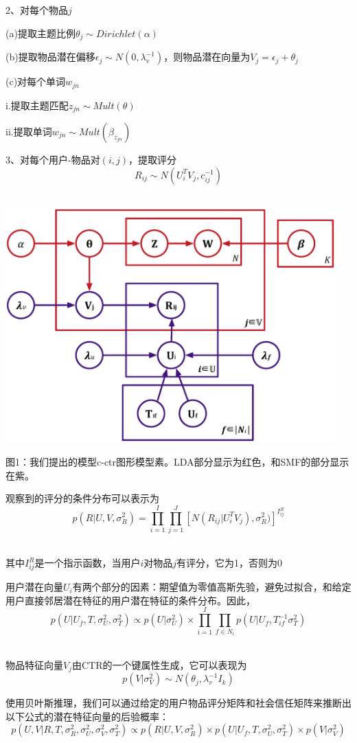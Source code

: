 \documentclass[10pt,a4paper]{article}
\theoremstyle{mythm}%
\numberwithin{equation}{section}
\begin{document}
2、对每个物品$j$

(a)提取主题比例$\theta_j \sim Dirichlet(\alpha)$

(b)提取物品潜在偏移$\epsilon_j \sim N(0,\lambda_v^{-1})$，则物品潜在向量为$V_j = \epsilon_j + \theta_j$

(c)对每个单词$w_{jn}$

i.提取主题匹配$z_{jn} \sim Mult(\theta)$

ii.提取单词$w_{jn}\sim Mult(\beta_{z_{jn}})$

3、对每个用户-物品对$(i,j)$，提取评分
\[R_{ij}\sim N(U_i^T V_j,c_{ij}^{-1})\]\

\includegraphics[width=5in]{figure1.eps} 

图1：我们提出的模型c-ctr图形模型素。LDA部分显示为红色，和SMF的部分显示在紫。

观察到的评分的条件分布可以表示为
\[p(R|U,V,\sigma_R^2) = {\prod}_{i=1}^I {\prod}_{j=1}^J{[N(R_{ij}|U_i^T V_j),\sigma_R^2)]}^{I_{ij}^R}\]\

其中$I_{ij}^R$是一个指示函数，当用户$i$对物品$j$有评分，它为1，否则为0

用户潜在向量$U_i$有两个部分的因素：期望值为零值高斯先验，避免过拟合，和给定用户直接邻居潜在特征的用户潜在特征的条件分布。因此，
\[p(U|U_f,T,\sigma_U^2,\sigma_T^2) \propto p(U|\sigma_U^2) \times {\prod}_{i=1}^I {\prod}_{f\in N_i} p(U|U_f,T_{if}^{-1}\sigma_T^2)\]\


物品特征向量$V_j$由CTR的一个键属性生成，它可以表现为
\[p(V|\sigma_V^2) \sim N(\theta_j,\lambda_v^{-1}I_k)\]

使用贝叶斯推理，我们可以通过给定的用户物品评分矩阵和社会信任矩阵来推断出以下公式的潜在特征向量的后验概率：
\[p(U,V|R,T,\sigma_R^2,\sigma_U^2,\sigma_V^2,\sigma_T^2) \propto p(R|U,V,\sigma_R^2) \times p(U|U_f,T,\sigma_U^2,\sigma_T^2) \times p(V|\sigma_V^2)\]
\end{document}

